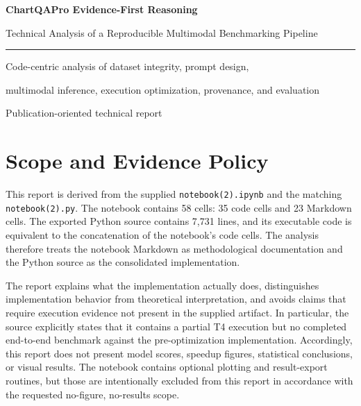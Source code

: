 \documentclass[11pt,a4paper]{article}
\newcommand{\code}[1]{\texttt{#1}}
\begin{document}
\begin{titlepage}
\centering
\vspace*{1.5cm}
{\LARGE\bfseries ChartQAPro Evidence-First Reasoning\par}
\vspace{0.7cm}
{\Large Technical Analysis of a Reproducible Multimodal Benchmarking Pipeline\par}
\vspace{1.8cm}
\rule{0.75\textwidth}{0.5pt}\par
\vspace{0.9cm}
{\large Code-centric analysis of dataset integrity, prompt design,\par}
{\large multimodal inference, execution optimization, provenance, and evaluation\par}
\vfill
{\large Publication-oriented technical report\par}
\end{titlepage}

\tableofcontents
\clearpage
{}

\section*{Scope and Evidence Policy}
This report is derived from the supplied \code{notebook(2).ipynb} and the matching \code{notebook(2).py}. The notebook contains 58 cells: 35 code cells and 23 Markdown cells. The exported Python source contains 7,731 lines, and its executable code is equivalent to the concatenation of the notebook's code cells. The analysis therefore treats the notebook Markdown as methodological documentation and the Python source as the consolidated implementation.

The report explains what the implementation actually does, distinguishes implementation behavior from theoretical interpretation, and avoids claims that require execution evidence not present in the supplied artifact. In particular, the source explicitly states that it contains a partial T4 execution but no completed end-to-end benchmark against the pre-optimization implementation. Accordingly, this report does not present model scores, speedup figures, statistical conclusions, or visual results. The notebook contains optional plotting and result-export routines, but those are intentionally excluded from this report in accordance with the requested no-figure, no-results scope.
\end{document}
